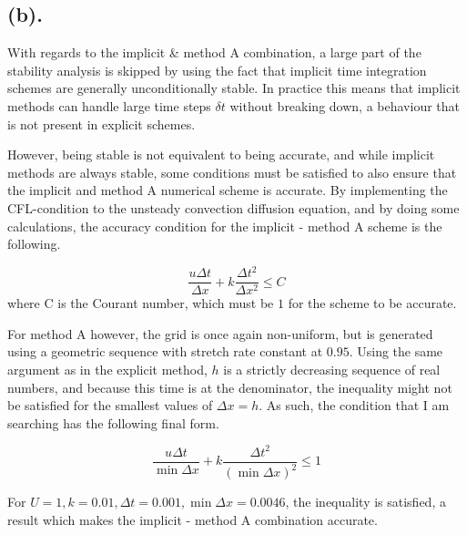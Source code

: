 
\subsection{(b).}
With regards to the implicit \& method A combination, a large part of the stability analysis is skipped by using the fact that implicit time integration schemes are generally unconditionally stable. In practice this means that implicit methods can handle large time steps \( \delta t \) without breaking down, a behaviour that is not present in explicit schemes.

However, being stable is not equivalent to being accurate, and while implicit methods are always stable, some conditions must be satisfied to also ensure that the implicit and method A numerical scheme is accurate. By implementing the CFL-condition to the unsteady convection diffusion equation, and by doing some calculations, the accuracy condition for the implicit - method A scheme is the following.

\[
	\frac{u \Delta t}{\Delta x} + k \frac{\Delta t^2}{\Delta x^2} \leq C
\]
where C is the Courant number, which must be \( 1 \) for the scheme to be accurate. 

For method A however, the grid is once again non-uniform, but is generated using a geometric sequence with stretch rate constant at \( 0.95 \). Using the same argument as in the explicit method, \( h \) is a strictly decreasing sequence of real numbers, and because this time is at the denominator, the inequality might not be satisfied for the smallest values of \( \Delta x = h \). As such, the condition that I am searching has the following final form.

\[
	\frac{u \Delta t}{\min{\Delta x}} + k \frac{\Delta t^2}{(\min{\Delta x})^2} \leq 1
\]

For \( U = 1, k = 0.01, \Delta t = 0.001, \min{\Delta x} = 0.0046 \), the inequality is satisfied, a result which makes the implicit - method A combination accurate.
